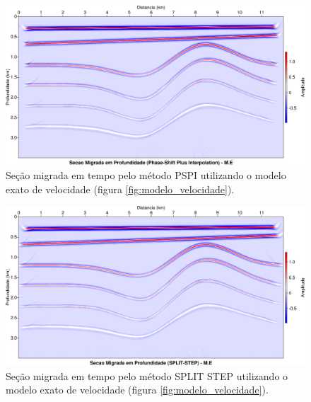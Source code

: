 \begin{landscape}
\begin{figure}[H]
\centering
\includegraphics[totalheight=14cm]{figuras/cap3/seis_Mig_PSPI_depth_me.pdf}
\caption{Seção migrada em tempo pelo método PSPI utilizando o modelo exato de velocidade (figura \ref{fig:modelo_velocidade}).}
\label{fig:seis_mig_depth_fd_me}
\end{figure}
\end{landscape}

\begin{landscape}
\begin{figure}[H]
\centering
\includegraphics[totalheight=14cm]{figuras/cap3/seis_Mig_SPLIT_STEP_depth_me.pdf}
\caption{Seção migrada em tempo pelo método SPLIT STEP utilizando o modelo exato de velocidade (figura \ref{fig:modelo_velocidade}).}
\label{fig:seis_mig_depth_fd_me}
\end{figure}
\end{landscape}
